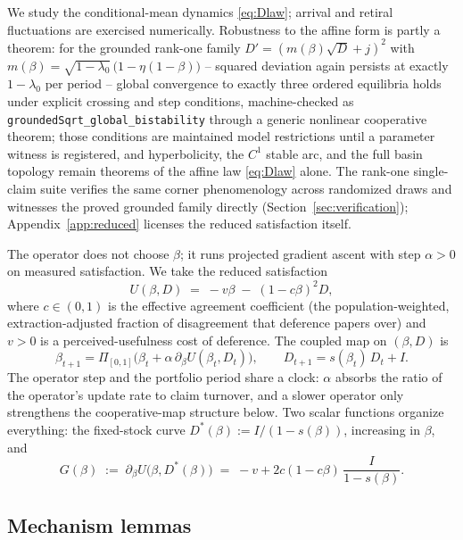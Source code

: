 \documentclass[11pt]{article}
\theoremstyle{definition}
\theoremstyle{remark}
\numberwithin{equation}{section}
\begin{document}
We study the conditional-mean dynamics \eqref{eq:Dlaw}; arrival and retiral fluctuations are exercised numerically. Robustness to the affine form is partly a theorem: for the grounded rank-one family $D' = (m(\beta)\sqrt{D} + j)^2$ with $m(\beta) = \sqrt{1-\lambda_0}\,\bigl(1-\eta(1-\beta)\bigr)$ -- squared deviation again persists at exactly $1-\lambda_0$ per period -- global convergence to exactly three ordered equilibria holds under explicit crossing and step conditions, machine-checked as \texttt{groundedSqrt\_global\_bistability} through a generic nonlinear cooperative theorem; those conditions are maintained model restrictions until a parameter witness is registered, and hyperbolicity, the $C^1$ stable arc, and the full basin topology remain theorems of the affine law \eqref{eq:Dlaw} alone. The rank-one single-claim suite verifies the same corner phenomenology across randomized draws and witnesses the proved grounded family directly (Section~\ref{sec:verification}); Appendix~\ref{app:reduced} licenses the reduced satisfaction itself.

The operator does not choose $\beta$; it runs projected gradient ascent with step $\alpha > 0$ on measured satisfaction. We take the reduced satisfaction
\begin{equation}\label{eq:U}
U(\beta, D) \;=\; -v\beta \;-\; (1-c\beta)^2 D,
\end{equation}
where $c \in (0,1)$ is the effective agreement coefficient (the population-weighted, extraction-adjusted fraction of disagreement that deference papers over) and $v > 0$ is a perceived-usefulness cost of deference. The coupled map on $(\beta, D)$ is
\begin{equation}\label{eq:map}
\beta_{t+1} = \Pi_{[0,1]}\!\bigl(\beta_t + \alpha\,\partial_\beta U(\beta_t, D_t)\bigr),
\qquad
D_{t+1} = s(\beta_t)\,D_t + I .
\end{equation}
The operator step and the portfolio period share a clock: $\alpha$ absorbs the ratio of the operator's update rate to claim turnover, and a slower operator only strengthens the cooperative-map structure below. Two scalar functions organize everything: the fixed-stock curve $D^\ast(\beta) := I/(1-s(\beta))$, increasing in $\beta$, and
\begin{equation}\label{eq:G}
G(\beta) \;:=\; \partial_\beta U\bigl(\beta, D^\ast(\beta)\bigr) \;=\; -v + 2c(1-c\beta)\,\frac{I}{1-s(\beta)} .
\end{equation}

\subsection{Mechanism lemmas}\label{sec:mech}
\end{document}
